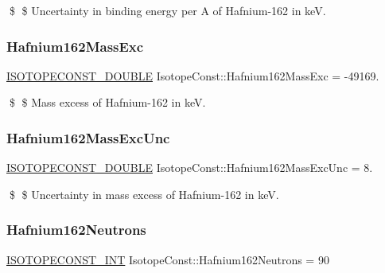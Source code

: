 \$ \$ Uncertainty in binding energy per A of Hafnium-\/162 in keV. \mbox{\label{group___isotope_const-_hafnium-_hf162_ga4d706e1cc1a6bc1a319b461483d44f48}} 
\subsubsection{\texorpdfstring{Hafnium162\+Mass\+Exc}{Hafnium162MassExc}}
{\footnotesize\ttfamily \mbox{\hyperlink{group___isotope_const-_macros_ga8f45a7272ce02c0b4c65c44636ed719a}{I\+S\+O\+T\+O\+P\+E\+C\+O\+N\+S\+T\+\_\+\+D\+O\+U\+B\+LE}} Isotope\+Const\+::\+Hafnium162\+Mass\+Exc = -\/49169.}

\$ \$ Mass excess of Hafnium-\/162 in keV. \mbox{\label{group___isotope_const-_hafnium-_hf162_ga26c0c1cd7f94489e3d6f2abec7acdb5c}} 
\subsubsection{\texorpdfstring{Hafnium162\+Mass\+Exc\+Unc}{Hafnium162MassExcUnc}}
{\footnotesize\ttfamily \mbox{\hyperlink{group___isotope_const-_macros_ga8f45a7272ce02c0b4c65c44636ed719a}{I\+S\+O\+T\+O\+P\+E\+C\+O\+N\+S\+T\+\_\+\+D\+O\+U\+B\+LE}} Isotope\+Const\+::\+Hafnium162\+Mass\+Exc\+Unc = 8.}

\$ \$ Uncertainty in mass excess of Hafnium-\/162 in keV. \mbox{\label{group___isotope_const-_hafnium-_hf162_ga04d5cf954811cf058b3b3c68d3d3d1bf}} 
\subsubsection{\texorpdfstring{Hafnium162\+Neutrons}{Hafnium162Neutrons}}
{\footnotesize\ttfamily \mbox{\hyperlink{group___isotope_const-_macros_ga5f18360b3e99483a35c32d789e62621c}{I\+S\+O\+T\+O\+P\+E\+C\+O\+N\+S\+T\+\_\+\+I\+NT}} Isotope\+Const\+::\+Hafnium162\+Neutrons = 90}

